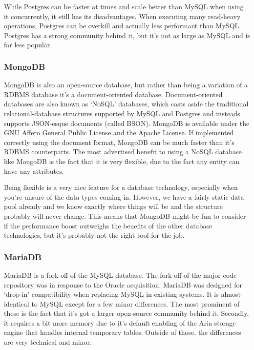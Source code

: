 While Postgres can be faster at times and scale better than MySQL when using it concurrently, it still has its disadvantages. 
When executing many read-heavy operations, Postgres can be overkill and actually less performant than MySQL. 
Postgres has a strong community behind it, but it’s not as large as MySQL and is far less popular. 

\subsubsection{MongoDB}
MongoDB is also an open-source database, but rather than being a variation of a RDBMS database it’s a document-oriented database. 
Document-oriented databases are also known as ‘NoSQL’ databases, which casts aside the traditional relational-database structures supported by MySQL and Postgres and insteads supports JSON-esque documents (called BSON). 
MongoDB is available under the GNU Affero General Public License and the Apache License. 
If implemented correctly using the document format, MongoDB can be much faster than it’s RDBMS counterparts. 
The most advertised benefit to using a NoSQL database like MongoDB is the fact that it is very flexible, due to the fact any entity can have any attributes. 

Being flexible is a very nice feature for a database technology, especially when you’re unsure of the data types coming in. 
However, we have a fairly static data pool already and we know exactly where things will be and the structure probably will never change. 
This means that MongoDB might be fun to consider if the performance boost outweighs the benefits of the other database technologies, but it’s probably not the right tool for the job. 

\subsubsection{MariaDB}
MariaDB is a fork off of the MySQL database. 
The fork off of the major code repository was in response to the Oracle acquisition. 
MariaDB was designed for ‘drop-in’ compatibility when replacing MySQL in existing systems. 
It is almost identical to MySQL except for a few minor differences. 
The most prominent of these is the fact that it’s got a larger open-source community behind it. 
Secondly, it requires a bit more memory due to it’s default enabling of the Aria storage engine that handles internal temporary tables. 
Outside of those, the differences are very technical and minor. 

